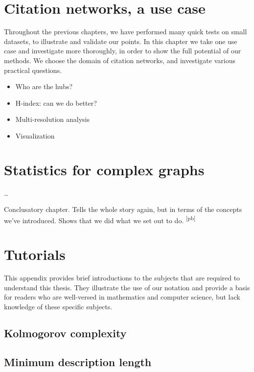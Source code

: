 \documentclass{thesis}
\newcommand{\pb}[1]{\textcolor{OliveGreen}{\small #1 \textsuperscript{[pb]} }}
\begin{document}
\chapter{Citation networks, a use case}

\begin{summary} Throughout the previous chapters, we have performed many quick tests on small datasets, to illustrate and validate our points. In this chapter we take one use case and investigate more thoroughly, in order to show the full potential of our methods. We choose the domain of citation networks, and investigate various practical questions.
\end{summary}

\begin{itemize}
  \item Who are the hubs?
  \item H-index: can we do better?
  \item Multi-resolution analysis
  \item Visualization
\end{itemize}

\chapter{Statistics for complex graphs}

\begin{summary}\ldots
\end{summary}

\pb{Conclusatory chapter. Tells the whole story again, but in terms of the concepts we've introduced. Shows that we did what we set out to do.}

\appendix
\chapter{Tutorials}
\begin{summary}
This appendix provides brief introductions to the subjects that are required to understand this thesis. They illustrate the use of our notation and provide a basis for readers who are well-versed in mathematics and computer science, but lack knowledge of these specific subjects. 
\end{summary}

\section{Kolmogorov complexity}
\section{Minimum description length}
\end{document}
